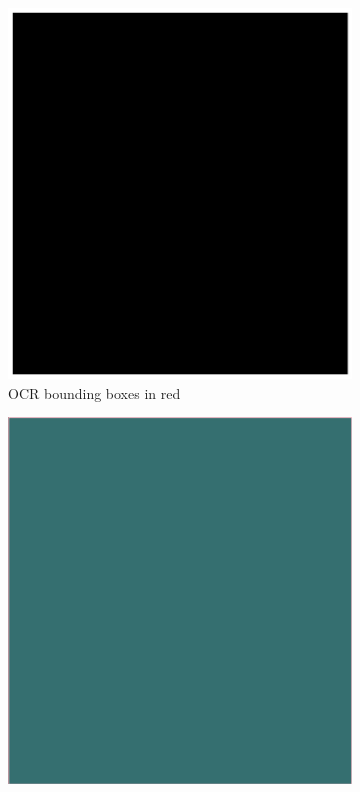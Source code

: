 \documentclass[oneside, english, bibtex]{kththesis}
\begin{document}
\begin{figure}[!htb]
\begin{adjustbox}{center}
\parbox{1.5\textwidth}{\lineskip=0pt
\begin{subfigure}{0.75\textwidth}
  \centering
  \includegraphics[width=\linewidth, clip=true, trim = 0mm 0mm 0mm 0mm]{figures/ocr/1RoKim0.jpg}
  \caption{OCR bounding boxes in red}
  \label{fig:1RoKim0_OCR}
\end{subfigure}%
\begin{subfigure}{0.75\textwidth}
  \centering
  \includegraphics[width=\linewidth, clip=true, trim = 0mm 0mm 0mm 0mm]{figures/bbox/1RoKim0.jpg}

\end{subfigure}}
\end{adjustbox}
\end{figure}
\end{document}
